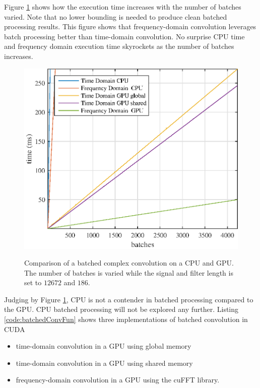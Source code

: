 Figure \ref{fig:CPUvsGPU_varyBatches_186taps_12672signal} shows how the execution time increases with the number of batches varied.
Note that no lower bounding is needed to produce clean batched processing results.
This figure shows that frequency-domain convolution leverages batch processing better than time-domain convolution.
No surprise CPU time and frequency domain execution time skyrockets as the number of batches increases.
\begin{figure}
	\centering\includegraphics[width=5in]{figures/gpu_intro/CPUvsGPU_varyBatches_186taps_12672signal.eps}
	\label{fig:CPUvsGPU_varyBatches_186taps_12672signal}
	\caption{Comparison of a batched complex convolution on a CPU and GPU. The number of batches is varied while the signal and filter length is set to $12672$ and $186$.}
\end{figure}

Judging by Figure \ref{fig:CPUvsGPU_varyBatches_186taps_12672signal}, CPU is not a contender in batched processing compared to the GPU.
CPU batched processing will not be explored any further.
Listing \ref{code:batchedConvFun} shows three implementations of batched convolution in CUDA
\begin{itemize}
  \item time-domain convolution in a GPU using global memory
  \item time-domain convolution in a GPU using shared memory
  \item frequency-domain convolution in a GPU using the cuFFT library.
\end{itemize}

